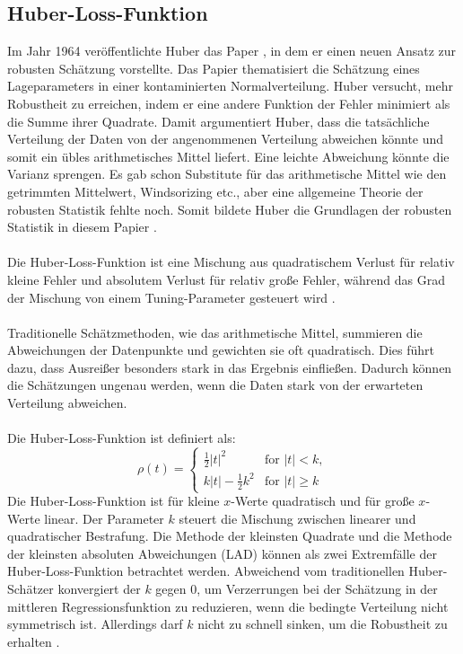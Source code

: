 \subsection{Huber-Loss-Funktion}
\label{huberregression}
Im Jahr 1964 veröffentlichte Huber das Paper , in dem er einen neuen Ansatz zur robusten Schätzung vorstellte. Das Papier thematisiert die Schätzung eines Lageparameters in einer kontaminierten Normalverteilung. Huber versucht, mehr Robustheit zu erreichen, indem er eine andere Funktion der Fehler minimiert als die Summe ihrer Quadrate. Damit argumentiert Huber, dass die tatsächliche Verteilung der Daten von der angenommenen Verteilung abweichen könnte und somit ein übles arithmetisches Mittel liefert. Eine leichte Abweichung könnte die Varianz sprengen. Es gab schon Substitute für das arithmetische Mittel wie den getrimmten Mittelwert, Windsorizing etc., aber eine allgemeine Theorie der robusten Statistik fehlte noch. Somit bildete Huber die Grundlagen der robusten Statistik in diesem Papier \cite{huberpapier}. \\\\
Die Huber-Loss-Funktion ist eine Mischung aus quadratischem Verlust für relativ kleine Fehler und absolutem Verlust für relativ große Fehler, während das Grad der Mischung von einem Tuning-Parameter gesteuert wird \cite{indirekthuber}. 
\\\\
Traditionelle Schätzmethoden, wie das arithmetische Mittel, summieren die Abweichungen der Datenpunkte und gewichten sie oft quadratisch. Dies führt dazu, dass Ausreißer besonders stark in das Ergebnis einfließen. Dadurch können die Schätzungen ungenau werden, wenn die Daten stark von der erwarteten Verteilung abweichen.    \\\\
Die Huber-Loss-Funktion ist definiert als:
\begin{equation}
\rho(t) = 
\begin{cases} 
  \frac{1}{2} |t|^2 & \text{for } |t| < k, \\ 
  k |t| - \frac{1}{2} k^2 & \text{for } |t| \geq k 
\end{cases}
\label{eq:huber}
\end{equation}
Die Huber-Loss-Funktion ist für kleine \(x\)-Werte quadratisch und für große \(x\)-Werte linear. Der Parameter \(k\) steuert die Mischung zwischen linearer und quadratischer Bestrafung. Die Methode der kleinsten Quadrate und die Methode der kleinsten absoluten Abweichungen (\ac{LAD}) können als zwei Extremfälle der Huber-Loss-Funktion betrachtet werden. Abweichend vom traditionellen Huber-Schätzer konvergiert der \(k\) gegen 0, um Verzerrungen bei der Schätzung in der mittleren Regressionsfunktion zu reduzieren, wenn die bedingte Verteilung nicht symmetrisch ist. Allerdings darf \(k\) nicht zu schnell sinken, um die Robustheit zu erhalten \cite{indirekthuber}. \\\\
